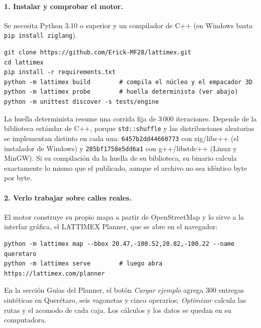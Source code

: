 \documentclass[11pt,a4paper]{article}
\newcommand{\tsl}[1]{\texttt{\small #1}}
\begin{document}
\paragraph{1. Instalar y comprobar el motor.} Se necesita Python 3.10 o superior y un compilador de
C++ (en Windows basta \tsl{pip install ziglang}).
\begin{verbatim}
git clone https://github.com/Erick-MF28/lattimex.git
cd lattimex
pip install -r requirements.txt
python -m lattimex build        # compila el núcleo y el empacador 3D
python -m lattimex probe        # huella determinista (ver abajo)
python -m unittest discover -s tests/engine
\end{verbatim}
La huella determinista resume una corrida fija de 3\,000 iteraciones. Depende de la biblioteca
estándar de C++, porque \tsl{std::shuffle} y las distribuciones aleatorias se implementan distinto en
cada una: \tsl{6457b2dd44660773} con zig/libc++ (el instalador de Windows) y
\tsl{285bf1758e5dd6a1} con g++/libstdc++ (Linux y MinGW). Si su compilación da la huella de su
biblioteca, su binario calcula exactamente lo mismo que el publicado, aunque el archivo no sea
idéntico byte por byte.

\paragraph{2. Verlo trabajar sobre calles reales.} El motor construye su propio mapa a partir de
OpenStreetMap y lo sirve a la interfaz gráfica, el LATTIMEX Planner, que se abre en el navegador:
\begin{verbatim}
python -m lattimex map --bbox 20.47,-100.52,20.82,-100.22 --name queretaro
python -m lattimex serve        # luego abra https://lattimex.com/planner
\end{verbatim}
En la sección Guías del Planner, el botón \emph{Cargar ejemplo} agrega 300 entregas sintéticas en
Querétaro, seis vagonetas y cinco operarios; \emph{Optimizar} calcula las rutas y el acomodo de cada
caja. Los cálculos y los datos se quedan en su computadora.
\end{document}
